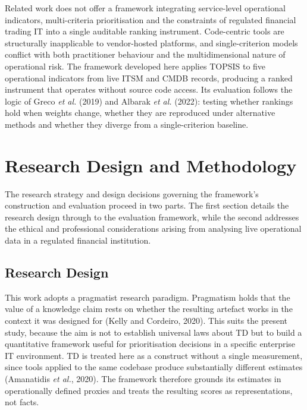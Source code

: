 \documentclass[
  12pt,
  letterpaper,
  12pt,
  oneside,
  english,
  onehalfspacing,
  headsepline]{MastersDoctoralThesis}
\begin{document}
Related work does not offer a framework integrating service-level
operational indicators, multi-criteria prioritisation and the
constraints of regulated financial trading IT into a single auditable
ranking instrument. Code-centric tools are structurally inapplicable to
vendor-hosted platforms, and single-criterion models conflict with both
practitioner behaviour and the multidimensional nature of operational
risk. The framework developed here applies TOPSIS to five operational
indicators from live ITSM and CMDB records, producing a ranked
instrument that operates without source code access. Its evaluation
follows the logic of Greco \emph{et al.} (2019) and Albarak \emph{et
al.} (2022): testing whether rankings hold when weights change, whether
they are reproduced under alternative methods and whether they diverge
from a single-criterion baseline.


\chapter{Research Design and Methodology}\label{sec-chapter3}

The research strategy and design decisions governing the framework's
construction and evaluation proceed in two parts. The first section
details the research design through to the evaluation framework, while
the second addresses the ethical and professional considerations arising
from analysing live operational data in a regulated financial
institution.

\section{Research Design}\label{research-design}

This work adopts a pragmatist research paradigm. Pragmatism holds that
the value of a knowledge claim rests on whether the resulting artefact
works in the context it was designed for (Kelly and Cordeiro, 2020).
This suits the present study, because the aim is not to establish
universal laws about TD but to build a quantitative framework useful for
prioritisation decisions in a specific enterprise IT environment. TD is
treated here as a construct without a single measurement, since tools
applied to the same codebase produce substantially different estimates
(Amanatidis \emph{et al.}, 2020). The framework therefore grounds its
estimates in operationally defined proxies and treats the resulting
scores as representations, not facts.
\end{document}
